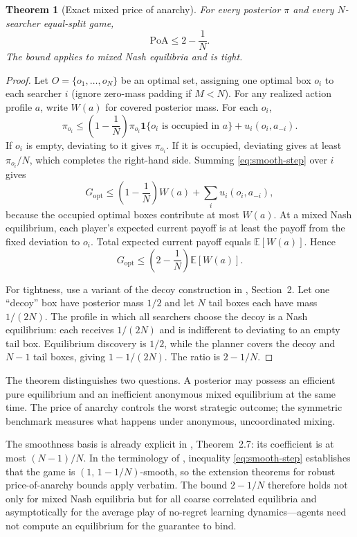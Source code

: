 \documentclass[11pt]{article}
\newtheorem{theorem}{Theorem}
\theoremstyle{definition}
\theoremstyle{remark}
\newcommand{\E}{\mathbb{E}}
\newcommand{\1}{\mathbf{1}}
\newcommand{\opt}{\mathrm{opt}}
\newcommand{\PoA}{\mathrm{PoA}}
\begin{document}
\begin{theorem}[Exact mixed price of anarchy]
\label{thm:poa}
For every posterior $\pi$ and every $N$-searcher equal-split game,
\begin{equation}
\PoA\le 2-\frac{1}{N}.
\label{eq:poa}
\end{equation}
The bound applies to mixed Nash equilibria and is tight.
\end{theorem}

\begin{proof}
Let $O=\{o_1,\ldots,o_N\}$ be an optimal set, assigning one optimal box $o_i$ to each searcher $i$ (ignore zero-mass padding if $M<N$). For any realized action profile $a$, write $W(a)$ for covered posterior mass. For each $o_i$,
\begin{equation}
\pi_{o_i}
\le \left(1-\frac{1}{N}\right)\pi_{o_i}\1\{o_i\text{ is occupied in }a\}
+u_i(o_i,a_{-i}).
\label{eq:smooth-step}
\end{equation}
If $o_i$ is empty, deviating to it gives $\pi_{o_i}$. If it is occupied, deviating gives at least $\pi_{o_i}/N$, which completes the right-hand side. Summing \cref{eq:smooth-step} over $i$ gives
\[
G_{\opt}\le\left(1-\frac{1}{N}\right)W(a)+\sum_i u_i(o_i,a_{-i}),
\]
because the occupied optimal boxes contribute at most $W(a)$. At a mixed Nash equilibrium, each player's expected current payoff is at least the payoff from the fixed deviation to $o_i$. Total expected current payoff equals $\E[W(a)]$. Hence
\[
G_{\opt}\le\left(2-\frac{1}{N}\right)\E[W(a)].
\]

For tightness, use a variant of the decoy construction in \citet{KleinbergOren2011}, Section~2. Let one ``decoy'' box have posterior mass $1/2$ and let $N$ tail boxes each have mass $1/(2N)$. The profile in which all searchers choose the decoy is a Nash equilibrium: each receives $1/(2N)$ and is indifferent to deviating to an empty tail box. Equilibrium discovery is $1/2$, while the planner covers the decoy and $N-1$ tail boxes, giving $1-1/(2N)$. The ratio is $2-1/N$.
\end{proof}

The theorem distinguishes two questions. A posterior may possess an efficient pure equilibrium and an inefficient anonymous mixed equilibrium at the same time. The price of anarchy controls the worst strategic outcome; the symmetric benchmark measures what happens under anonymous, uncoordinated mixing.

The smoothness basis is already explicit in \citet{KleinbergOren2011}, Theorem~2.7: its coefficient is at most $(N-1)/N$. In the terminology of \citet{Roughgarden2015}, inequality \cref{eq:smooth-step} establishes that the game is $(1,\,1-1/N)$-smooth, so the extension theorems for robust price-of-anarchy bounds apply verbatim. The bound $2-1/N$ therefore holds not only for mixed Nash equilibria but for all coarse correlated equilibria and asymptotically for the average play of no-regret learning dynamics---agents need not compute an equilibrium for the guarantee to bind.
\end{document}
